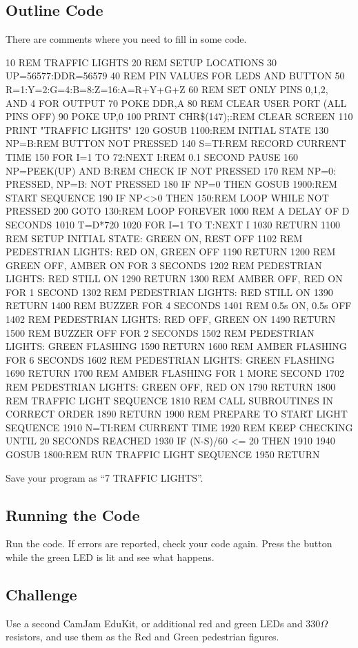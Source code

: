 \subsection*{Outline Code}

There are comments where you need to fill in some code.
\begin{basic}
10 REM TRAFFIC LIGHTS
20 REM SETUP LOCATIONS
30 UP=56577:DDR=56579
40 REM PIN VALUES FOR LEDS AND BUTTON
50 R=1:Y=2:G=4:B=8:Z=16:A=R+Y+G+Z
60 REM SET ONLY PINS 0,1,2, AND 4 FOR OUTPUT
70 POKE DDR,A
80 REM CLEAR USER PORT (ALL PINS OFF)
90 POKE UP,0
100 PRINT CHR\$(147);:REM CLEAR SCREEN
110 PRINT "TRAFFIC LIGHTS"
120 GOSUB 1100:REM INITIAL STATE
130 NP=B:REM BUTTON NOT PRESSED
140 S=TI:REM RECORD CURRENT TIME
150 FOR I=1 TO 72:NEXT I:REM 0.1 SECOND PAUSE
160 NP=PEEK(UP) AND B:REM CHECK IF NOT PRESSED
170 REM NP=0: PRESSED, NP=B: NOT PRESSED
180 IF NP=0 THEN GOSUB 1900:REM START SEQUENCE
190 IF NP<>0 THEN 150:REM LOOP WHILE NOT PRESSED
200 GOTO 130:REM LOOP FOREVER
1000 REM A DELAY OF D SECONDS
1010 T=D*720
1020 FOR I=1 TO T:NEXT I
1030 RETURN
1100 REM SETUP INITIAL STATE: GREEN ON, REST OFF
1102 REM PEDESTRIAN LIGHTS: RED ON, GREEN OFF
1190 RETURN
1200 REM GREEN OFF, AMBER ON FOR 3 SECONDS
1202 REM PEDESTRIAN LIGHTS: RED STILL ON
1290 RETURN
1300 REM AMBER OFF, RED ON FOR 1 SECOND
1302 REM PEDESTRIAN LIGHTS: RED STILL ON
1390 RETURN
1400 REM BUZZER FOR 4 SECONDS
1401 REM 0.5s ON, 0.5s OFF
1402 REM PEDESTRIAN LIGHTS: RED OFF, GREEN ON
1490 RETURN
1500 REM BUZZER OFF FOR 2 SECONDS
1502 REM PEDESTRIAN LIGHTS: GREEN FLASHING
1590 RETURN
1600 REM AMBER FLASHING FOR 6 SECONDS
1602 REM PEDESTRIAN LIGHTS: GREEN FLASHING
1690 RETURN
1700 REM AMBER FLASHING FOR 1 MORE SECOND
1702 REM PEDESTRIAN LIGHTS: GREEN OFF, RED ON
1790 RETURN
1800 REM TRAFFIC LIGHT SEQUENCE
1810 REM CALL SUBROUTINES IN CORRECT ORDER
1890 RETURN
1900 REM PREPARE TO START LIGHT SEQUENCE
1910 N=TI:REM CURRENT TIME
1920 REM KEEP CHECKING UNTIL 20 SECONDS REACHED
1930 IF (N-S)/60 <= 20 THEN 1910
1940 GOSUB 1800:REM RUN TRAFFIC LIGHT SEQUENCE
1950 RETURN
\end{basic}

Save your program as ``7 TRAFFIC LIGHTS''.

\subsection*{Running the Code}

Run the code.  If errors are reported, check your code again.  Press the button while the green LED is lit and see what happens.

\subsection*{Challenge}

Use a second CamJam EduKit, or additional red and green LEDs and 330$\Omega$ resistors, and use them as the Red and Green pedestrian figures.
